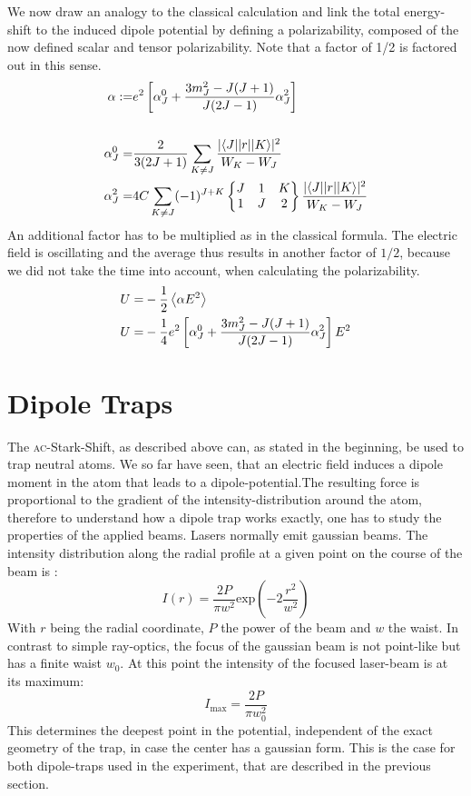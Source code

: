 We now draw an analogy to the classical calculation and link the total energy-shift to the induced dipole potential by defining a polarizability, composed of the now defined scalar and tensor polarizability. Note that a factor of 1/2 is factored out in this sense.
\begin{align}
\alpha:=&e^2\left[\alpha^0_J+\frac{3m^2_J-J(J+1)}{J(2J-1)}\alpha^2_J\right]\\
\notag\\
\alpha^0_J=&\frac{2}{3(2J+1)}\sum_{K\neq J}\frac{|\langle J| |r| | K\rangle|^2}{W_K-W_J}\\
\alpha^2_J=&4C\sum_{K\neq J}(-1)^{J+K}\begin{Bmatrix}J&1&K\\1&J&2\end{Bmatrix}\frac{|\langle J| |r| | K\rangle|^2}{W_K-W_J}
\end{align}
An additional factor has to be multiplied as in the classical formula. The electric field is oscillating and the average thus results in another factor of $1/2$, because we did not take the time into account, when calculating the polarizability. 
\begin{align}
U=&-\frac{1}{2}\left\langle \alpha E^2\right\rangle\notag\\
U=&-\frac{1}{4}e^2\left[\alpha^0_J+\frac{3m^2_J-J(J+1)}{J(2J-1)}\alpha^2_J\right]E^2\label{shift}
\end{align}

\section{Dipole Traps}

The \textsc{ac}-Stark-Shift, as described above can, as stated in the beginning, be used to trap neutral atoms. We so far have seen, that an electric field induces a dipole moment in the atom that leads to a dipole-potential.The resulting force is proportional to the gradient of the intensity-distribution around the atom, therefore to understand how a dipole trap works exactly, one has to study the properties of the applied beams. Lasers normally emit gaussian beams. The intensity distribution along the radial profile at a given point on the course of the beam is \cite{dipole}:
\begin{equation}
I(r)=\frac{2P}{\pi w^2}\mathrm{exp}\left(-2\frac{r^2}{w^2}\right)
\end{equation}
With $r$ being the radial coordinate, $P$ the power of the beam and $w$ the waist. In contrast to simple ray-optics, the focus of the gaussian beam is not point-like but has a finite waist $w_0$. At this point the intensity of the focused laser-beam is at its maximum:
\begin{equation}
I_{\mathrm{max}}=\frac{2P}{\pi w^2_0}
\end{equation}
This determines the deepest point in the potential, independent of the exact geometry of the trap, in case the center has a gaussian form. This is the case for both dipole-traps used in the experiment, that are described in the previous section.